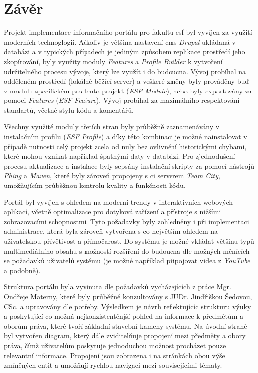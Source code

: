 \chapter{Závěr}

Projekt implementace informačního portálu pro fakultu \gls{esf} byl vyvíjen za využití moderních technoglogií. Ačkoliv je většina nastavení \gls{cms} \emph{Drupal} ukládaná v databázi a v typických případech je jediným způsobem replikace prostředí jeho zkopírování, byly využity moduly \emph{Features} a \emph{Profile Builder} k vytvoření udržitelného procesu vývoje, který lze využít i do budoucna. Vývoj probíhal na odděleném prostředí (lokálně běžící server) a veškeré změny byly prováděny buď v modulu specifickém pro tento projekt (\emph{ESF Module}), nebo byly exportovány za pomoci \emph{Features} (\emph{ESF Feature}). Vývoj probíhal za maximálního respektování standartů, včetně stylu kódu a komentářů. 

Všechny využité moduly třetích stran byly průběžně zaznamenávány v instalačním profilu (\emph{ESF Profile}) a díky této kombinaci je možné nainstalovat v případě nutnosti celý projekt zcela od nuly bez ovlivnění historickými chybami, které mohou vznikat například špatnými daty v databázi. Pro zjednodušení procesu aktualizace a instalace byly sepsány instalační skripty za pomocí nástrojů \emph{Phing} a \emph{Maven}, které byly zároveň propojeny s \gls{ci} 
serverem \emph{Team City}, umožňujícím průběžnou kontrolu kvality a funkčnosti kódu.

Portál byl vyvíjen s ohledem na moderní trendy v interaktivních webových aplikací, včetně optimalizace pro dotyková zařízení a přístroje s nižšími zobrazovacími schopnostmi. Tyto požadavky byly zohledněny i při implementaci administrace, která byla zároveň vytvořena s co největším ohledem na uživatelskou přívětivost a přímočarost. Do systému je možné vkládat většinu typů multimediálního obsahu s možností rozšíření do budoucna dle možných měnících se požadavků uživatelů systému (je možné například připojovat videa z \emph{YouTube} a podobně).

Struktura portálu byla vyvinuta dle požadavků vycházejících z práce Mgr. Ondřeje Materny, které byly průběžně konzultovány s JUDr. Jindřiškou Šedovou, CSc. a upravovány dle potřeby. Výsledkem je návrh reflektujícíc strukturu výuky a poskytující co možná nejkonzistentěnjší pohled na informace k předmětům a oborům práva, které tvoří základní stavební kameny systému. Na úvodní straně byl vytvořen diagram, který dále zviditelňuje propojení mezi předměty a obory práva, čímž uživatelům poskytuje jednoduchou možnost procházet pouze relevantní informace. Propojení jsou zobrazena i na stránkách obou výše zmíněných entit a umožňují rychlou navigaci mezi souvisejícími tématy. 

